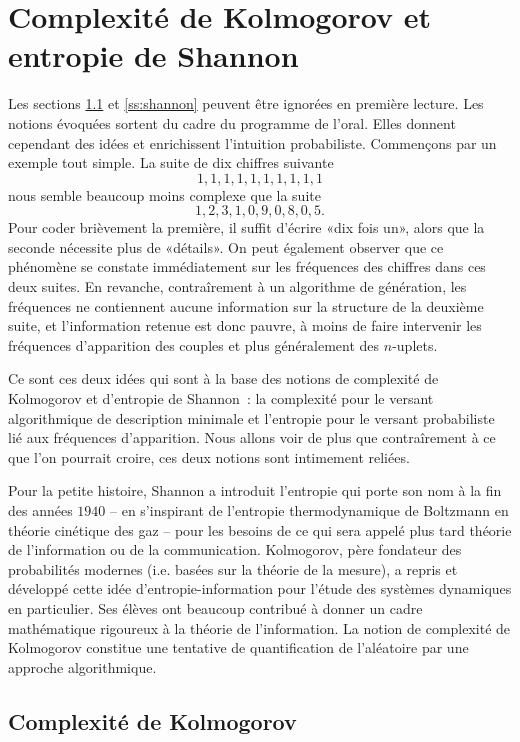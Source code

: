 %
\section{Complexité de Kolmogorov et entropie de Shannon}
%

Les sections \ref{ss:kolmogorov} et \ref{ss:shannon} peuvent être ignorées en
première lecture. Les notions évoquées sortent du cadre du programme de
l'oral. Elles donnent cependant des idées et enrichissent l'intuition
probabiliste. Commençons par un exemple tout simple. La suite de dix chiffres
suivante
$$1,1,1,1,1,1,1,1,1,1$$
nous semble beaucoup moins complexe que la suite
$$1,2,3,1,0,9,0,8,0,5.$$
Pour coder brièvement la première, il suffit d'écrire
«dix fois un», alors que la seconde nécessite plus de «détails». On peut
également observer que ce phénomène se constate immédiatement sur les
fréquences des chiffres dans ces deux suites. En revanche, contraîrement à un
algorithme de génération, les fréquences ne contiennent aucune information sur
la structure de la deuxième suite, et l'information retenue est donc pauvre, à
moins de faire intervenir les fréquences d'apparition des couples et plus
généralement des $n$-uplets.

Ce sont ces deux idées qui sont à la base des notions de complexité de
Kolmogorov et d'entropie de Shannon~: la complexité pour le versant
algorithmique de description minimale et l'entropie pour le versant
probabiliste lié aux fréquences d'apparition. Nous allons voir de plus que
contraîrement à ce que l'on pourrait croire, ces deux notions sont intimement
reliées.

Pour la petite histoire, Shannon a introduit l'entropie qui porte son nom à la
fin des années $1940$ -- en s'inspirant de l'entropie thermodynamique de
Boltzmann en théorie cinétique des gaz -- pour les besoins de ce qui sera
appelé plus tard théorie de l'information ou de la communication. Kolmogorov,
père fondateur des probabilités modernes (i.e. basées sur la théorie de la
mesure), a repris et développé cette idée d'entropie-information pour l'étude
des systèmes dynamiques en particulier. Ses élèves ont beaucoup contribué à
donner un cadre mathématique rigoureux à la théorie de l'information. La
notion de complexité de Kolmogorov constitue une tentative de quantification
de l'aléatoire par une approche algorithmique.

\subsection{Complexité de Kolmogorov}\label{ss:kolmogorov}

